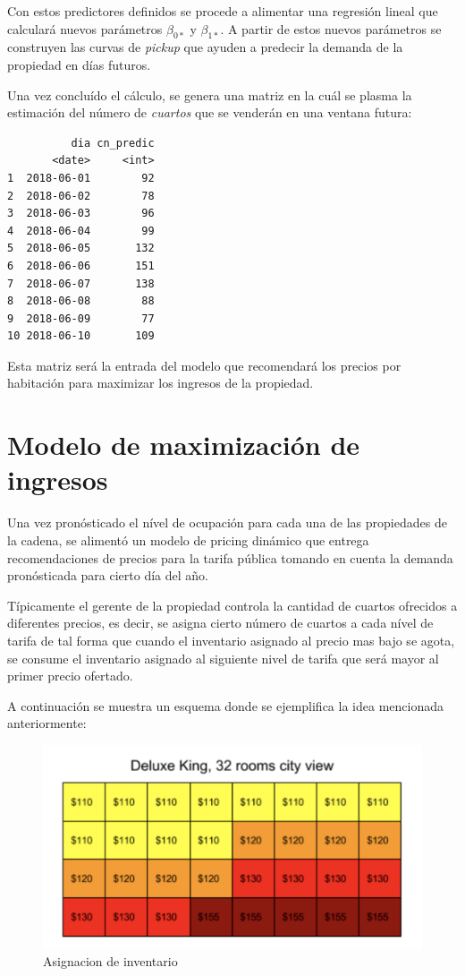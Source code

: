 Con estos predictores definidos se procede a alimentar una regresión lineal que calculará nuevos parámetros $\beta_{0*}$ y $\beta_{1*}$. A partir de estos nuevos parámetros se construyen las curvas de \emph{pickup} que ayuden a predecir la demanda de la propiedad en días futuros.

Una vez concluído el cálculo, se genera una matriz en la cuál se plasma la estimación del número de \emph{cuartos} que se venderán en una ventana futura:

\begin{verbatim}
          dia cn_predic
       <date>     <int>
1  2018-06-01        92
2  2018-06-02        78
3  2018-06-03        96
4  2018-06-04        99
5  2018-06-05       132
6  2018-06-06       151
7  2018-06-07       138
8  2018-06-08        88
9  2018-06-09        77
10 2018-06-10       109
\end{verbatim}

Esta matriz será la entrada del modelo que recomendará los precios por habitación para maximizar los ingresos de la propiedad.


\section*{Modelo de maximización de ingresos}

Una vez pronósticado el nível de ocupación para cada una de las propiedades de la cadena, se alimentó un modelo de pricing dinámico que entrega recomendaciones de precios para la tarifa pública tomando en cuenta la demanda pronósticada para cierto día del año.

Típicamente el gerente de la propiedad controla la cantidad de cuartos ofrecidos a diferentes precios, es decir, se asigna cierto número de cuartos a cada nível de tarifa de tal forma que cuando el inventario asignado al precio mas bajo se agota, se consume el inventario asignado al siguiente nivel de tarifa que será mayor al primer precio ofertado.

A continuación se muestra un esquema donde se ejemplifica la idea mencionada anteriormente:

\begin{figure}[!]
  \includegraphics[width=\linewidth]{Figures/buckets.png}
  \caption{Asignacion de inventario}
  \label{fig:Asignacion de Inventario}
\end{figure}


